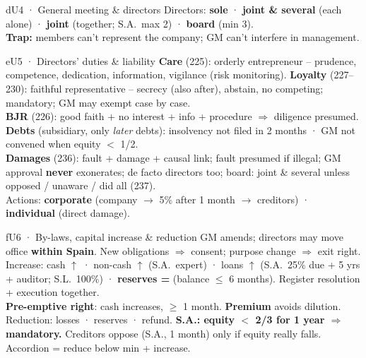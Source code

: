 \documentclass[9pt]{extarticle}
\newcommand{\T}[1]{{\color{trap}\textbf{Trap:} #1}}
\begin{document}
{\begin{bx}{d}{U4 · General meeting \& directors}
Directors: \textbf{sole} · \textbf{joint \& several} (each alone) · \textbf{joint} (together; S.A.\ max 2) · \textbf{board} (min 3).\\
\T{members can't represent the company; GM can't interfere in management.}
\end{bx}
\begin{bx}{e}{U5 · Directors' duties \& liability}
\textbf{Care} (225): orderly entrepreneur -- prudence, competence, dedication, information, vigilance (risk monitoring). \textbf{Loyalty} (227--230): faithful representative -- secrecy (also after), abstain, no competing; mandatory; GM may exempt case by case.\\
\textbf{BJR} (226): good faith + no interest + info + procedure $\Rightarrow$ diligence presumed.\\
\textbf{Debts} (subsidiary, only \textit{later} debts): insolvency not filed in 2 months · GM not convened when equity $<$ 1/2.\\
\textbf{Damages} (236): fault + damage + causal link; fault presumed if illegal; GM approval \textbf{never} exonerates; de facto directors too; board: joint \& several unless opposed / unaware / did all (237).\\
Actions: \textbf{corporate} (company $\rightarrow$ 5\% after 1 month $\rightarrow$ creditors) · \textbf{individual} (direct damage).
\end{bx}
\begin{bx}{f}{U6 · By-laws, capital increase \& reduction}
GM amends; directors may move office \textbf{within Spain}. New obligations $\Rightarrow$ consent; purpose change $\Rightarrow$ exit right.\\
Increase: cash $\uparrow$ · non-cash $\uparrow$ (S.A.\ expert) · loans $\uparrow$ (S.A.\ 25\% due + 5 yrs + auditor; S.L.\ 100\%) · \textbf{reserves =} (balance $\leq$ 6 months). Register resolution + execution together.\\
\textbf{Pre-emptive right}: cash increases, $\geq$ 1 month. \textbf{Premium} avoids dilution.\\
Reduction: losses · reserves · refund. \textbf{S.A.: equity $<$ 2/3 for 1 year $\Rightarrow$ mandatory.} Creditors oppose (S.A., 1 month) only if equity really falls. Accordion = reduce below min + increase.
\end{bx}
}
\end{document}
